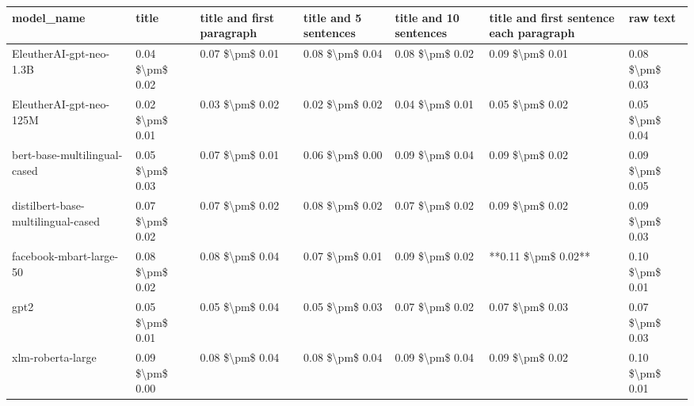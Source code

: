 \begin{tabular}{lllllll}
\toprule
                        model\_name &           title & title and first paragraph & title and 5 sentences & title and 10 sentences & title and first sentence each paragraph &        raw text \\
\midrule
           EleutherAI-gpt-neo-1.3B & 0.04 \$\textbackslash pm\$ 0.02 &           0.07 \$\textbackslash pm\$ 0.01 &       0.08 \$\textbackslash pm\$ 0.04 &        0.08 \$\textbackslash pm\$ 0.02 &                         0.09 \$\textbackslash pm\$ 0.01 & 0.08 \$\textbackslash pm\$ 0.03 \\
           EleutherAI-gpt-neo-125M & 0.02 \$\textbackslash pm\$ 0.01 &           0.03 \$\textbackslash pm\$ 0.02 &       0.02 \$\textbackslash pm\$ 0.02 &        0.04 \$\textbackslash pm\$ 0.01 &                         0.05 \$\textbackslash pm\$ 0.02 & 0.05 \$\textbackslash pm\$ 0.04 \\
      bert-base-multilingual-cased & 0.05 \$\textbackslash pm\$ 0.03 &           0.07 \$\textbackslash pm\$ 0.01 &       0.06 \$\textbackslash pm\$ 0.00 &        0.09 \$\textbackslash pm\$ 0.04 &                         0.09 \$\textbackslash pm\$ 0.02 & 0.09 \$\textbackslash pm\$ 0.05 \\
distilbert-base-multilingual-cased & 0.07 \$\textbackslash pm\$ 0.02 &           0.07 \$\textbackslash pm\$ 0.02 &       0.08 \$\textbackslash pm\$ 0.02 &        0.07 \$\textbackslash pm\$ 0.02 &                         0.09 \$\textbackslash pm\$ 0.02 & 0.09 \$\textbackslash pm\$ 0.03 \\
           facebook-mbart-large-50 & 0.08 \$\textbackslash pm\$ 0.02 &           0.08 \$\textbackslash pm\$ 0.04 &       0.07 \$\textbackslash pm\$ 0.01 &        0.09 \$\textbackslash pm\$ 0.02 &                     **0.11 \$\textbackslash pm\$ 0.02** & 0.10 \$\textbackslash pm\$ 0.01 \\
                              gpt2 & 0.05 \$\textbackslash pm\$ 0.01 &           0.05 \$\textbackslash pm\$ 0.04 &       0.05 \$\textbackslash pm\$ 0.03 &        0.07 \$\textbackslash pm\$ 0.02 &                         0.07 \$\textbackslash pm\$ 0.03 & 0.07 \$\textbackslash pm\$ 0.03 \\
                 xlm-roberta-large & 0.09 \$\textbackslash pm\$ 0.00 &           0.08 \$\textbackslash pm\$ 0.04 &       0.08 \$\textbackslash pm\$ 0.04 &        0.09 \$\textbackslash pm\$ 0.04 &                         0.09 \$\textbackslash pm\$ 0.02 & 0.10 \$\textbackslash pm\$ 0.01 \\
\bottomrule
\end{tabular}
